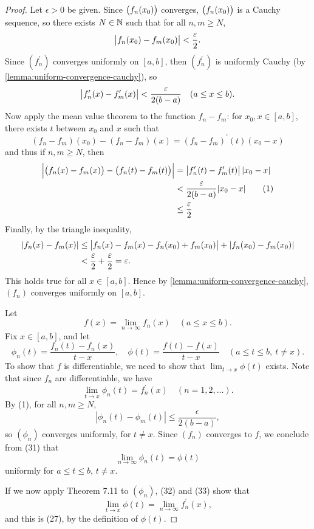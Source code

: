 \begin{proof}
Let $\epsilon>0$ be given. Since $\left(f_n(x_0)\right)$ converges, $\left(f_n(x_0)\right)$ is a Cauchy sequence, so there exists $N\in\mathbb N$ such that for all $n,m\ge N$,
\[\left|f_n(x_0)-f_m(x_0)\right|<\frac{\varepsilon}{2}.\]
Since $(f_n^\prime)$ converges uniformly on $[a,b]$, then $(f_n^\prime)$ is uniformly Cauchy (by \cref{lemma:uniform-convergence-cauchy}), so
\[\left|f_n^\prime(x)-f_m^\prime(x)\right|<\frac{\varepsilon}{2(b-a)}\quad(a\le x\le b).\]
Now apply the mean value theorem to the function $f_n-f_m$: for $x_0,x\in[a,b]$, there exists $t$ between $x_0$ and $x$ such that
\[(f_n-f_m)(x_0)-(f_n-f_m)(x)=(f_n-f_m)^\prime(t)(x_0-x)\]
and thus if $n,m\ge N$, then
\begin{align*}
\left|\left(f_n(x)-f_m(x)\right)-\left(f_n(t)-f_m(t)\right)\right|
&=\left|f_n^\prime(t)-f_m^\prime(t)\right||x_0-x|\\
&<\frac{\varepsilon}{2(b-a)}|x_0-x|\tag{1}\\
&\le\frac{\varepsilon}{2}
\end{align*}
Finally, by the triangle inequality,
\begin{align*}
|f_n(x)-f_m(x)|
&\le\left|f_n(x)-f_m(x)-f_n(x_0)+f_m(x_0)\right|+|f_n(x_0)-f_m(x_0)|\\
&<\frac{\varepsilon}{2}+\frac{\varepsilon}{2}=\varepsilon.
\end{align*}
This holds true for all $x\in[a,b]$. Hence by \cref{lemma:uniform-convergence-cauchy}, $(f_n)$ converges uniformly on $[a,b]$.

Let 
\[f(x)=\lim_{n\to\infty}f_n(x)\quad(a\le x\le b).\]
Fix $x\in[a,b]$, and let
\[\phi_n(t)=\frac{f_n(t)-f_n(x)}{t-x},\quad\phi(t)=\frac{f(t)-f(x)}{t-x}\quad(a\le t\le b,\:t\neq x).\]
To show that $f$ is differentiable, we need to show that $\displaystyle\lim_{t\to x}\phi(t)$ exists. Note that since $f_n$ are differentiable, we have
\[\lim_{t\to x}\phi_n(t)=f_n^\prime(x)\quad(n=1,2,\dots).\]
By (1), for all $n,m\ge N$,
\[|\phi_n(t)-\phi_m(t)|\le\frac{\epsilon}{2(b-a)},\]
so $(\phi_n)$ converges uniformly, for $t\neq x$. Since $(f_n)$ converges to $f$, we conclude from (31) that
\[\lim_{n\to\infty}\phi_n(t)=\phi(t)\]
uniformly for $a\le t\le b$, $t\neq x$. 

If we now apply Theorem 7.11 to $(\phi_n)$, (32) and (33) show that
\[\lim_{t\to x}\phi(t)=\lim_{n\to\infty}f_n^\prime(x),\]
and this is (27), by the definition of $\phi(t)$. 
\end{proof}

